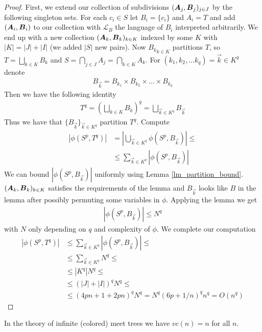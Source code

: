 \documentclass{amsart}
\DeclareMathOperator{\A}{\boldface A}
\DeclareMathOperator{\B}{\boldface B}
\renewcommand{\LL}{\mathcal L}
\begin{document}
\begin{proof}
	First, we extend our collection of subdivisions $(\A_j, \B_j)_{j \in J}$ by the following singleton sets. For each $c_i \in S$ let $B_i = \{c_i\}$ and $A_i = T$ and add $(\A_i, \B_i)$ to our collection with $\LL_B$ the language of $B_i$ interpreted arbitrarily. We end up with a new collection $(\A_k, \B_k)_{k \in K}$ indexed by some $K$ with $|K| = |J| + |I|$ (we added $|S|$ new pairs). Now ${B_k}_{k \in K}$ partitions $T$, so $T = \bigsqcup_{k \in K} B_k$ and $S = \bigcap_{j \in J} A_j = \bigcap_{k \in K} A_k$. For $(k_1, k_2, \ldots k_q) = \vec k \in K^q$ denote 
	\begin{align*}
		B_{\vec k} = B_{k_1} \times B_{k_2} \times \ldots \times B_{k_q}
	\end{align*}
	Then we have the following identity
	\begin{align*}
		T^q = (\bigsqcup_{k \in K} B_k)^q = \bigsqcup_{\vec k \in K^q} B_{\vec k}
	\end{align*}
	Thus we have that $\{B_{\vec k}\}_{\vec k \in K^q}$ partition $T^q$. Compute
	\begin{align*}
		|\phi(S^p, T^q)|
		&= \left|\bigcup_{\vec k \in K^q} \phi(S^p, B_{\vec k}) \right| \leq \\
		&\leq \sum_{\vec k \in K^q} |\phi(S^p, B_{\vec k})|
	\end{align*}
	We can bound $|\phi(S^p, B_{\vec k})|$ uniformly using Lemma \ref{lm_partition_bound}. $(\A_k, \B_k)_{k \in K}$ satisfies the requirements of the lemma and $B_{\vec k}$ looks like $B$ in the lemma after possibly permuting some variables in $\phi$. Applying the lemma we get
	\begin{align*}
		|\phi(S^p, B_{\vec k})| \leq N^q
	\end{align*}
	with $N$ only depending on $q$ and complexity of $\phi$. We complete our computation
	\begin{align*}
		|\phi(S^p, T^q)|
		&\leq \sum_{\vec k \in K^q} |\phi(S^p, B_{\vec k})| \leq \\
		&\leq \sum_{\vec k \in K^q} N^q \leq \\
		&\leq |K^q| N^q \leq \\
		&\leq (|J| + |I|)^q N^q \leq \\
		&\leq (4pn + 1 + 2pn)^q N^q = N^q (6p + 1/n)^q n^q = O(n^q)
	\end{align*}
	\end{proof}
	\begin{Corollary}
		In the theory of infinite (colored) meet trees we have $vc(n) = n$ for all $n$.
	\end{Corollary}
\end{document}

